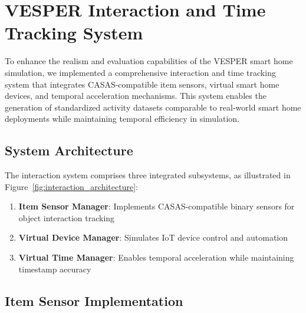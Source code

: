 \documentclass[conference]{IEEEtran}
\begin{document}

\section{VESPER Interaction and Time Tracking System}
\label{sec:interaction_system}

To enhance the realism and evaluation capabilities of the VESPER smart home simulation, we implemented a comprehensive interaction and time tracking system that integrates CASAS-compatible item sensors, virtual smart home devices, and temporal acceleration mechanisms. This system enables the generation of standardized activity datasets comparable to real-world smart home deployments while maintaining temporal efficiency in simulation.

\subsection{System Architecture}

The interaction system comprises three integrated subsystems, as illustrated in Figure~\ref{fig:interaction_architecture}:

\begin{enumerate}
    \item \textbf{Item Sensor Manager}: Implements CASAS-compatible binary sensors for object interaction tracking
    \item \textbf{Virtual Device Manager}: Simulates IoT device control and automation
    \item \textbf{Virtual Time Manager}: Enables temporal acceleration while maintaining timestamp accuracy
\end{enumerate}


\subsection{Item Sensor Implementation}
\end{document}
